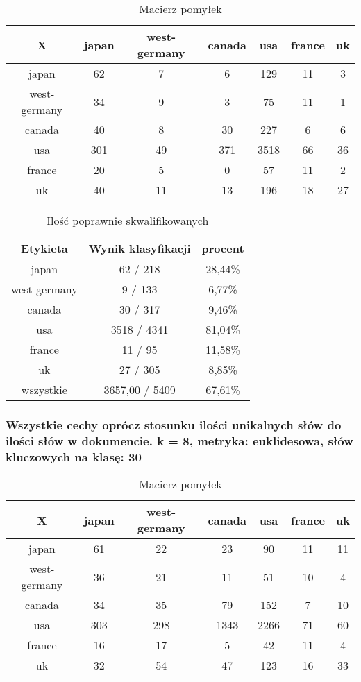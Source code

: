 \documentclass{classrep}
\begin{document}
\begin{table}[h]
\centering
\begin{tabular}{|c|c|c|c|c|c|c|}
\hline
 X  & japan & west-germany & canada & usa & france & uk\\
\hline
japan & 62 & 7 & 6 & 129 & 11 & 3\\
\hline
west-germany & 34 & 9 & 3 & 75 & 11 & 1\\
\hline
canada & 40 & 8 & 30 & 227 & 6 & 6\\
\hline
usa & 301 & 49 & 371 & 3518 & 66 & 36\\
\hline
france & 20 & 5 & 0 & 57 & 11 & 2\\
\hline
uk & 40 & 11 & 13 & 196 & 18 & 27\\
\hline
\end{tabular}
\caption{Macierz pomyłek}\end{table}

\begin{table}[h]
\centering
\begin{tabular}{|c|c|c|}
\hline
Etykieta & Wynik klasyfikacji & procent\\
\hline
japan & 62 / 218 & 28,44\%\\
\hline
west-germany & 9 / 133 & 6,77\%\\
\hline
canada & 30 / 317 & 9,46\%\\
\hline
usa & 3518 / 4341 & 81,04\%\\
\hline
france & 11 / 95 & 11,58\%\\
\hline
uk & 27 / 305 & 8,85\%\\
\hline
wszystkie & 3657,00 / 5409 & 67,61\%\\
\hline
\end{tabular}
\caption{Ilość poprawnie skwalifikowanych}\end{table}

\newpage
\subsubsection{Wszystkie cechy oprócz stosunku ilości unikalnych słów do ilości słów w dokumencie. k = 8, metryka: euklidesowa, słów kluczowych na klasę: 30}
\begin{table}[h]
\centering
\begin{tabular}{|c|c|c|c|c|c|c|}
\hline
 X  & japan & west-germany & canada & usa & france & uk\\
\hline
japan & 61 & 22 & 23 & 90 & 11 & 11\\
\hline
west-germany & 36 & 21 & 11 & 51 & 10 & 4\\
\hline
canada & 34 & 35 & 79 & 152 & 7 & 10\\
\hline
usa & 303 & 298 & 1343 & 2266 & 71 & 60\\
\hline
france & 16 & 17 & 5 & 42 & 11 & 4\\
\hline
uk & 32 & 54 & 47 & 123 & 16 & 33\\
\hline
\end{tabular}
\caption{Macierz pomyłek}\end{table}
\end{document}
